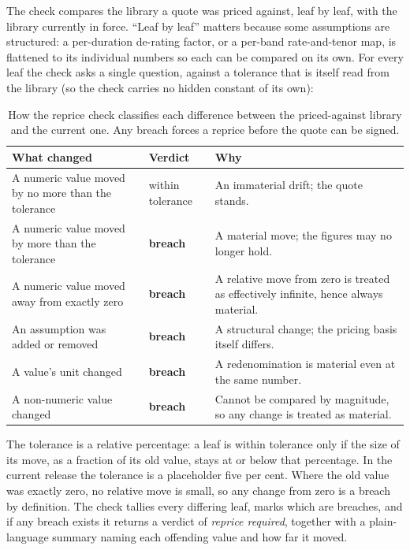 The check compares the library a quote was priced against, leaf by leaf, with the library currently in force. ``Leaf by leaf'' matters because some assumptions are structured: a per-duration de-rating factor, or a per-band rate-and-tenor map, is flattened to its individual numbers so each can be compared on its own. For every leaf the check asks a single question, against a tolerance that is itself read from the library (so the check carries no hidden constant of its own):

\begin{table}[H]
\centering
\caption{How the reprice check classifies each difference between the priced-against library and the current one. Any breach forces a reprice before the quote can be signed.}
\label{tab:reprice}
\small\sffamily
\begin{tabularx}{\textwidth}{@{}L l L@{}}
\toprule
\textbf{What changed} & \textbf{Verdict} & \textbf{Why} \\
\midrule
A numeric value moved by no more than the tolerance & within tolerance & An immaterial drift; the quote stands. \\
A numeric value moved by more than the tolerance & \textbf{breach} & A material move; the figures may no longer hold. \\
A numeric value moved away from exactly zero & \textbf{breach} & A relative move from zero is treated as effectively infinite, hence always material. \\
An assumption was added or removed & \textbf{breach} & A structural change; the pricing basis itself differs. \\
A value's unit changed & \textbf{breach} & A redenomination is material even at the same number. \\
A non-numeric value changed & \textbf{breach} & Cannot be compared by magnitude, so any change is treated as material. \\
\bottomrule
\end{tabularx}
\end{table}

The tolerance is a relative percentage: a leaf is within tolerance only if the size of its move, as a fraction of its old value, stays at or below that percentage. In the current release the tolerance is a placeholder five per cent. Where the old value was exactly zero, no relative move is small, so any change from zero is a breach by definition. The check tallies every differing leaf, marks which are breaches, and if any breach exists it returns a verdict of \emph{reprice required}, together with a plain-language summary naming each offending value and how far it moved.

